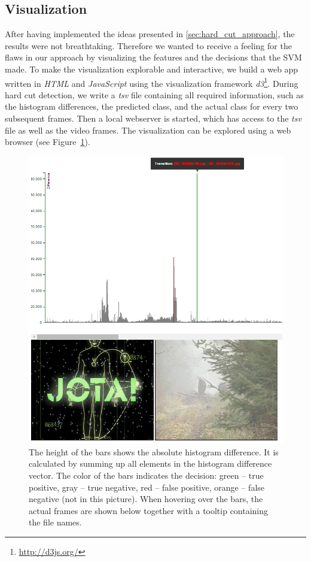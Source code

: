 \subsection{Visualization}
\label{sec:hard_cut_visualization}

After having implemented the ideas presented in \ref{sec:hard_cut_approach}, the results were not breathtaking.
Therefore we wanted to receive a feeling for the flaws in our approach by visualizing the features and the decisions that the SVM made.
To make the visualization explorable and interactive, we build a web app written in \emph{HTML} and \emph{JavaScript} using the visualization framework \emph{d3}\footnote{\url{http://d3js.org/}}.
During hard cut detection, we write a \emph{tsv} file containing all required information, such as the histogram differences, the predicted class, and the actual class for every two subsequent frames.
Then a local webserver is started, which has access to the \emph{tsv} file as well as the video frames.
The visualization can be explored using a web browser (see Figure~\ref{fig:hard_cut_visualization}).

\begin{figure}[ht]
	\centering
	\includegraphics[scale=.5]{images/hard_cut_visualization.png}
	\caption{The height of the bars shows the absolute histogram difference.
    It is calculated by summing up all elements in the histogram difference vector.
    The color of the bars indicates the decision: green -- true positive, gray -- true negative, red -- false positive, orange -- false negative (not in this picture).
    When hovering over the bars, the actual frames are shown below together with a tooltip containing the file names.}
	\label{fig:hard_cut_visualization}
\end{figure}

